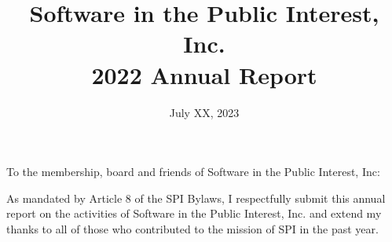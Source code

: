 \documentclass[a4paper]{report}
\begin{document}
\title{Software in the Public Interest, Inc.\\
2022 Annual Report}
\date{July XX, 2023}

\maketitle

\newpage


\hspace{1em}

To the membership, board and friends of Software in the Public Interest, Inc:

As mandated by Article 8 of the SPI Bylaws, I respectfully submit this annual report on the activities of Software in the Public Interest, Inc. and extend my thanks to all of those who contributed to the mission of SPI in the past year.
\end{document}

